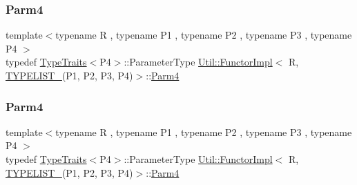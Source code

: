 \subsubsection{\texorpdfstring{Parm4}{Parm4}\hspace{0.1cm}{\footnotesize\ttfamily [1/2]}}
{\footnotesize\ttfamily template$<$typename R , typename P1 , typename P2 , typename P3 , typename P4 $>$ \\
typedef \mbox{\hyperlink{classUtil_1_1TypeTraits}{Type\+Traits}}$<$P4$>$\+::Parameter\+Type \mbox{\hyperlink{classUtil_1_1FunctorImpl}{Util\+::\+Functor\+Impl}}$<$ R, \mbox{\hyperlink{install_2include_2adat_2typelist_8h_a7a156c571ab21a16b0495e1c882a07fa}{T\+Y\+P\+E\+L\+I\+S\+T\+\_}}(P1, P2, P3, P4)$>$\+::\mbox{\hyperlink{structUtil_1_1Private_1_1FunctorImplBase_a1ad7fe3f243480c44a610927ebe76762}{Parm4}}}

\mbox{\label{classUtil_1_1FunctorImpl_3_01R_00_01TYPELIST__4_07P1_00_01P2_00_01P3_00_01P4_08_4_a7375a2710126cb146191bd1c17af2f1d}} 
\subsubsection{\texorpdfstring{Parm4}{Parm4}\hspace{0.1cm}{\footnotesize\ttfamily [2/2]}}
{\footnotesize\ttfamily template$<$typename R , typename P1 , typename P2 , typename P3 , typename P4 $>$ \\
typedef \mbox{\hyperlink{classUtil_1_1TypeTraits}{Type\+Traits}}$<$P4$>$\+::Parameter\+Type \mbox{\hyperlink{classUtil_1_1FunctorImpl}{Util\+::\+Functor\+Impl}}$<$ R, \mbox{\hyperlink{install_2include_2adat_2typelist_8h_a7a156c571ab21a16b0495e1c882a07fa}{T\+Y\+P\+E\+L\+I\+S\+T\+\_}}(P1, P2, P3, P4)$>$\+::\mbox{\hyperlink{structUtil_1_1Private_1_1FunctorImplBase_a1ad7fe3f243480c44a610927ebe76762}{Parm4}}}

\mbox{\label{classUtil_1_1FunctorImpl_3_01R_00_01TYPELIST__4_07P1_00_01P2_00_01P3_00_01P4_08_4_a9218a4b4370d688d3e144a75e5d24cfe}} 
